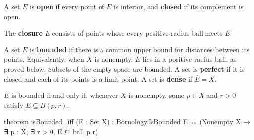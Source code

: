 \begin{definition}
  \label{ma:def:open-closed-sets}
  A set $E$ is \textbf{open} if every point of $E$ is interior, and \textbf{closed} if its
  complement is open.
\end{definition}

\begin{definition}
  \label{ma:def:closure}
  The \textbf{closure} $\overline E$ consists of points whose every positive-radius ball meets
  $E$.
\end{definition}

\begin{definition}
  \label{ma:def:bounded-perfect-dense-sets}
  A set $E$ is \textbf{bounded} if there is a common upper bound for distances between its points.
  Equivalently, when $X$ is nonempty, $E$ lies in a positive-radius ball, as proved below.
  Subsets of the empty space are bounded.
  A set is \textbf{perfect} if it is closed and each of its points is a limit point.
  A set is \textbf{dense} if $\overline E=X$.
\end{definition}

\begin{lemma}
  \label{ma:lem:isBounded-iff}
  $E$ is bounded if and only if, whenever $X$ is nonempty, some $p\in X$ and $r>0$ satisfy $E\subseteq B(p,r)$.

  \begin{lean}
    theorem isBounded_iff (E : Set X) :
        Bornology.IsBounded E ↔ (Nonempty X → ∃ p : X, ∃ r > 0, E ⊆ ball p r)
  \end{lean}
\end{lemma}

